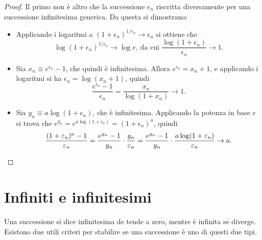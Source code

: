 \begin{proof}
Il primo non è altro che la successione $e_n$ riscritta diversamente per una successione infinitesima generica. Da questa si dimostrano:
\begin{itemize}
\item Applicando i logaritmi a $(1+\epsilon_n)^{1/\epsilon_n}\to\epsilon_n$ si ottiene che
\[
\log(1+\epsilon_n)^{1/\epsilon_n}\to\log e\text{,  da cui  }\frac{\log(1+\epsilon_n)}{\epsilon_n}\to 1.
\]
\item Sia $x_n\equiv e^{\epsilon_n}-1$, che quindi è infinitesima. Allora $e^{\epsilon_n}=x_n+1$, e applicando i logaritmi si ha $\epsilon_n=\log(x_n+1)$, quindi
\[
\frac{e^{\epsilon_n}-1}{\epsilon_n}=\frac{x_n}{\log(1+x_n)}\to 1.
\]
\item Sia $y_n\equiv a\log(1+\epsilon_n)$, che è infinitesima. Applicando la potenza in base $e$ si trova che $e^{y_n}=e^{a\log(1+\epsilon_n)}=(1+\epsilon_n)^a$, quindi
\[
\frac{(1+\epsilon_n)^a-1}{\epsilon_n}=\frac{e^{y_n}-1}{y_n}\cdot\frac{y_n}{\epsilon_n}=\frac{e^{y_n}-1}{y_n}\cdot\frac{a\log(1+\epsilon_n)}{\epsilon_n}\to a.\qedhere
\]
\end{itemize}
\end{proof}

\section{Infiniti e infinitesimi}
Una successione si dice infinitesima de tende a zero, mentre è infinita se diverge. Esistono due utili criteri per stabilire se una successione è uno di questi due tipi.

